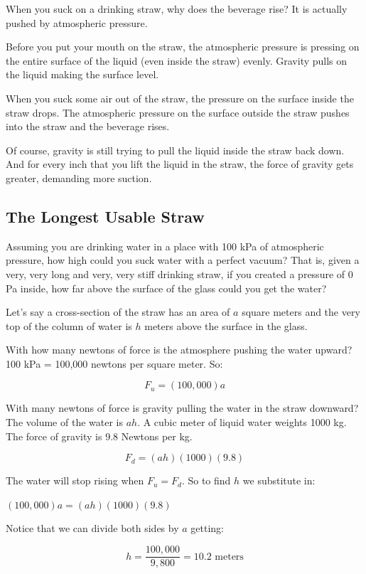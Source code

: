 When you suck on a drinking straw,  why does the beverage rise?  
It is actually pushed by atmospheric pressure.

Before you put your mouth on the straw,  the atmospheric pressure is pressing on the 
entire surface of the liquid (even inside the straw) evenly.   Gravity pulls on the liquid making the surface
level.

When you suck some air out of the straw,  the pressure on the surface inside the straw drops.  The atmospheric pressure on the surface outside the straw pushes into the straw and the beverage rises.

Of course,  gravity is still trying to pull the liquid inside the straw back down.  And for every inch that you lift the liquid in the straw,  the force of gravity gets greater, demanding more suction.

\subsection{The Longest Usable Straw}
  
Assuming you are drinking water in a place with 100 kPa of atmospheric pressure,   how high could 
you suck water with a perfect vacuum?  That is,  given a very, very long and very, very stiff drinking straw,  if you created a pressure of 0 Pa inside,  how far above the surface of the glass 
could you get the water? 

Let's say a cross-section of the straw has an area of $a$ square meters and the very top of the 
column of water is $h$ meters above the surface in the glass. 

With how many newtons of force is the atmosphere pushing the water upward?  100 kPa = 100,000 newtons per square meter.  So:

$$F_u = (100,000)a$$

With many newtons of force is gravity pulling the water in the straw downward?  The volume of the water is $ah$.  A cubic meter of liquid water weights 1000 kg.  The force of gravity is 9.8 Newtons per kg.

$$F_d = (ah)(1000)(9.8)$$

The water will stop rising when $F_u = F_d$.  So to find $h$ we substitute in:

$(100,000)a = (ah)(1000)(9.8)$

Notice that we can divide both sides by $a$ getting:

$$h = \frac{100,000}{9,800} = 10.2 \text{ meters}$$

